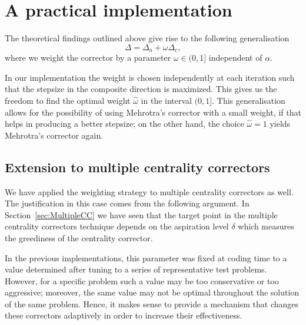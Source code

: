 

%
%
\section{A practical implementation}

The theoretical findings 
outlined above give rise to the following generalisation
\[
\Delta = \Delta_{a} +\omega\Delta_c,
\]
where we weight the corrector by a parameter $\omega\in(0,1]$ 
independent of $\alpha$.

In our implementation the weight is chosen independently at each 
iteration such that the stepsize in the composite direction 
is maximized. This gives us the freedom to find the optimal weight 
$\hat\omega$ in the interval $(0,1]$. 
%
This generalisation allows for the possibility of using Mehrotra's 
corrector with a small weight, if that helps in producing a better
stepsize; on the other hand, 
the choice $\hat\omega=1$ yields Mehrotra's corrector again. 


%
%
\subsection{Extension to multiple centrality correctors}

We have applied the weighting strategy to multiple centrality correctors 
as well. The justification in this case comes from the following argument.
In Section~\ref{sec:MultipleCC} we have seen that the target point 
in the multiple centrality correctors technique depends on the
aspiration level
$\delta$ which measures the greediness of the centrality corrector. 

In the previous implementations, this parameter was fixed at coding time 
to a value determined after tuning to a series of representative 
test problems. However, for a specific problem such a value may be 
too conservative or too aggressive; moreover, the same value may not 
be optimal throughout the solution of the same problem. 
Hence, it makes sense to provide 
a mechanism that changes these correctors adaptively in order 
to increase their effectiveness.

